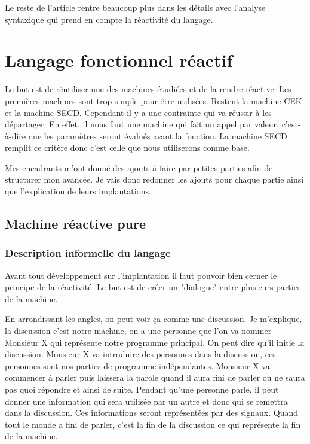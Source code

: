 \documentclass[10pt,a4paper]{article}
\begin{document}
				Le reste de l'article rentre beaucoup plus dans les détails avec l'analyse syntaxique qui prend en compte la réactivité du langage.
			
				\newpage
			
			
			
	\section{Langage fonctionnel réactif}\label{SECDConc4}
			
		Le but est de réutiliser une des machines étudiées et de la rendre réactive. Les premières machines sont trop simple pour être utilisées. Restent la machine CEK et la machine SECD. Cependant il y a une contrainte qui va réussir à les départager. En effet, il nous faut une machine qui fait un appel par valeur, c'est-à-dire que les paramètres seront évalués avant la fonction. La machine SECD remplit ce critère donc c'est celle que nous utiliserons comme base.
		\medbreak
			
		Mes encadrants m'ont donné des ajouts à faire par petites parties afin de structurer mon avancée. Je vais donc redonner les ajouts pour chaque partie ainsi que l'explication de leurs implantations.
		\bigbreak
			
			
		\subsection{Machine réactive pure}
		
			\subsubsection{Description informelle du langage}
				
				Avant tout développement sur l'implantation il faut pouvoir bien cerner le principe de la réactivité. Le but est de créer un "dialogue" entre plusieurs parties de la machine. 
				\medbreak
					
				En arrondissant les angles, on peut voir ça comme une discussion. Je m'explique, la discussion c'est notre machine, on a une personne que l'on va nommer Monsieur X qui représente notre programme principal. On peut dire qu'il initie la discussion. Monsieur X va introduire des personnes dans la discussion, ces personnes sont nos parties de programme indépendantes. Monsieur X va commencer à parler puis laissera la parole quand il aura fini de parler ou ne saura pas quoi répondre et ainsi de suite. Pendant qu'une personne parle, il peut donner une information qui sera utilisée par un autre et donc qui se remettra dans la discussion. Ces informations seront représentées par des signaux. Quand tout le monde a fini de parler, c'est la fin de la discussion ce qui représente la fin de la machine.
				\medbreak
					
\end{document}
